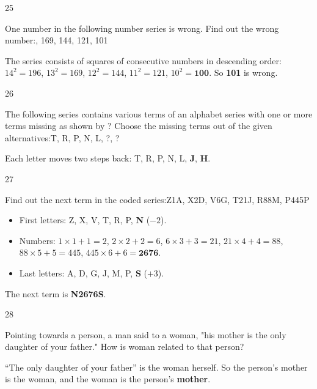 \begin{question}{25}
{One number in the following number series is wrong. Find out the wrong number:, 169, 144, 121, 101\par}
\begin{explain}
The series consists of squares of consecutive numbers in descending order: $14^2=196$, $13^2=169$, $12^2=144$, $11^2=121$, $10^2=\mathbf{100}$. So \textbf{101} is wrong.
\end{explain}
\end{question}

\begin{question}{26}
{The following series contains various terms of an alphabet series with one or more terms missing as shown by ? Choose the missing terms out of the given alternatives:\newline T, R, P, N, L, ?, ?\par}
\begin{explain}
Each letter moves two steps back: T, R, P, N, L, \textbf{J}, \textbf{H}.
\end{explain}
\end{question}

\begin{question}{27}
{Find out the next term in the coded series:\newline Z1A, X2D, V6G, T21J, R88M, P445P\par}
\begin{explain}
\begin{itemize}
\item First letters: Z, X, V, T, R, P, \textbf{N} ($-2$).
\item Numbers: $1\times1+1=2$, $2\times2+2=6$, $6\times3+3=21$, $21\times4+4=88$, $88\times5+5=445$, $445\times6+6=\mathbf{2676}$.
\item Last letters: A, D, G, J, M, P, \textbf{S} ($+3$).
\end{itemize}
The next term is \textbf{N2676S}.
\end{explain}
\end{question}

\begin{question}{28}
{Pointing towards a person, a man said to a woman, "his mother is the only daughter of your father." How is woman related to that person?\par}
\begin{explain}
``The only daughter of your father'' is the woman herself. So the person's mother is the woman, and the woman is the person's \textbf{mother}.
\end{explain}
\end{question}

